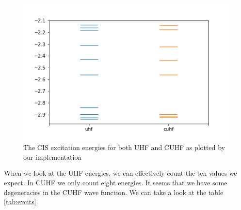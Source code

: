 \documentclass[twoside,twocolumn,9pt]{article}
\begin{document}
\begin{center}
  \begin{figure}[h]
    \includegraphics[width=\linewidth]{./../notes/figures/h3_cis.png}
    \caption{The CIS excitation energies for both UHF and CUHF as plotted by our implementation}
    \label{fig:h3_cis}
  \end{figure}
\end{center}

When we look at the UHF energies, we can effectively count the ten values we expect. In CUHF we only count eight energies. It seems that we have some degeneracies in the CUHF
wave function. We can take a look at the table \ref{tab:excits}.
\end{document}
